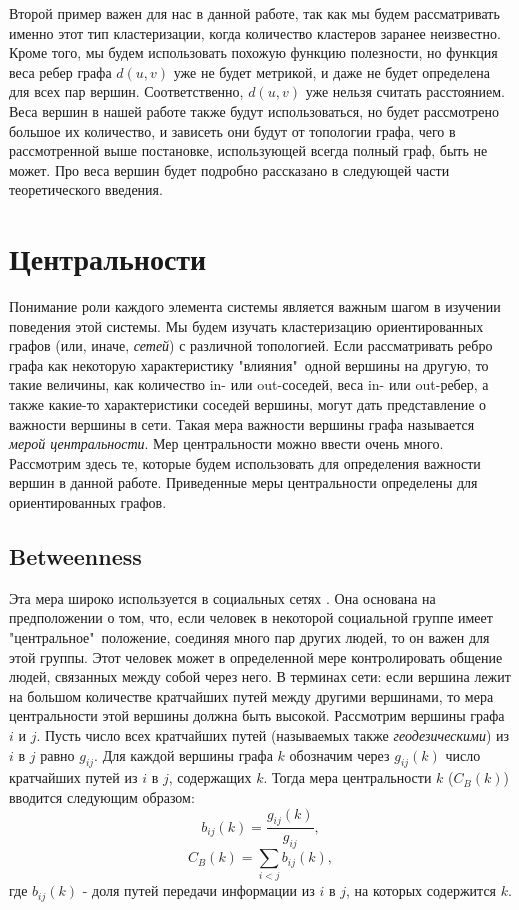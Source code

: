 Второй пример важен для нас в данной работе, так как мы будем рассматривать именно этот тип кластеризации, когда количество кластеров заранее неизвестно. Кроме того, мы будем использовать похожую функцию полезности, но функция веса ребер графа $d(u, v)$ уже не будет метрикой, и даже не будет определена для всех пар вершин. Соответственно, $d(u, v)$ уже нельзя считать расстоянием. Веса вершин в нашей работе также будут использоваться, но будет рассмотрено большое их количество, и зависеть они будут от топологии графа, чего в рассмотренной выше постановке, использующей всегда полный граф, быть не может. Про веса вершин будет подробно рассказано в следующей части теоретического введения. 

\section{Центральности}

Понимание роли каждого элемента системы является важным шагом в изучении поведения этой системы. Мы будем изучать кластеризацию ориентированных графов (или, иначе, \textit{сетей}) с различной топологией. Если рассматривать ребро графа как некоторую характеристику "влияния"\ одной вершины на другую, то такие величины, как количество in- или out-соседей, веса in- или out-ребер, а также какие-то характеристики соседей вершины, могут дать представление о важности вершины в сети. Такая мера важности вершины графа называется \textit{мерой центральности}. Мер центральности можно ввести очень много. Рассмотрим здесь те, которые будем использовать для определения важности вершин в данной работе. Приведенные меры центральности определены для ориентированных графов.

\subsection{Betweenness}
Эта мера широко используется в социальных сетях \cite{betweenness}. Она основана на предположении о том, что, если человек в некоторой социальной группе имеет "центральное"\ положение, соединяя много пар других людей, то он важен для этой группы. Этот человек может в определенной мере контролировать общение людей, связанных между собой через него. В терминах сети: если вершина лежит на большом количестве кратчайших путей между другими вершинами, то мера центральности этой вершины должна быть высокой. Рассмотрим вершины графа $i$ и $j$. Пусть число всех кратчайших путей (называемых также \textit{геодезическими}) из $i$ в $j$ равно $g_{ij}$. Для каждой вершины графа $k$ обозначим через $g_{ij}(k)$ число кратчайших путей из $i$ в $j$, содержащих $k$. Тогда мера центральности $k$ ($C_B(k)$) вводится следующим образом:
	\begin{equation}
	b_{ij}(k) = \frac{g_{ij}(k)}{g_{ij}},
	\end{equation}
	\begin{equation}
	C_B(k) = \sum_{i<j}b_{ij}(k),
	\end{equation}
где $b_{ij}(k)$ - доля путей передачи информации из $i$ в $j$, на которых содержится $k$. 
	
